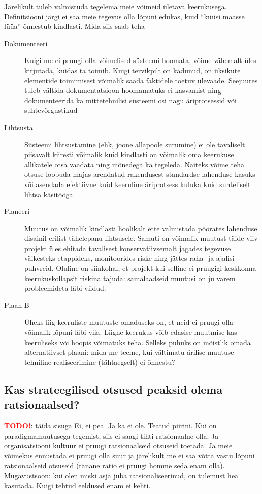\documentclass{tufte-book}
\newcommand{\TODO}{\textcolor{red}{\bf TODO!}\xspace}
\begin{document}
Järelikult tuleb valmistuda tegelema meie võimeid ületava keerukusega. Definitsiooni järgi ei saa meie tegevus olla lõpuni edukas, kuid \enquote{küüsi maasse lüüa} õnnestub kindlasti. Mida siis saab teha 
\begin{description}
	\item[Dokumenteeri] Kuigi me ei pruugi olla võimelised süsteemi hoomata, võime vähemalt üles kirjutada, kuidas ta toimib. Kuigi tervikpilt on kadunud, on üksikute elementide toimimisest võimalik saada faktidele toetuv ülevaade. Seejuures tuleb vältida dokumentatsioon hoomamatuks ei kasvamist ning dokumenteerida ka mittetehnilisi süsteemi osi nagu äriprotsessid või suhtevõrgustikud
	\item[Lihtsusta] Süsteemi lihtsustamine (ehk, joone allapoole surumine) ei ole tavaliselt piisavalt kiiresti võimalik kuid kindlasti on võimalik oma keerukuse allikatele otsa vaadata ning mõnedega ka tegeleda. Näiteks võime teha otsuse loobuda majas arendatud rakendusest standardse lahenduse kasuks või asendada efektiivne kuid keeruline äriprotsess kuluka kuid suhteliselt lihtsa käsitööga
	\item[Planeeri] Muutus on võimalik kindlasti hoolikalt ette valmistada pöörates lahenduse disainil erilist tähelepanu lihtsusele. Samuti on võimalik muutust täide viiv projekt üles ehitada tavalisest konservatiivsemalt jagades tegevuse väikesteks etappideks, monitoorides riske ning jättes raha- ja ajalisi puhvreid. Oluline on siinkohal, et projekt kui selline ei pruugigi keskkonna keerukuskollapsit riskina tajuda: samalaadseid muutusi on ju varem probleemideta läbi viidud. 
	\item[Plaan B] Üheks liig keeruliste muutuste omaduseks on, et neid ei pruugi olla võimalik lõpuni läbi viia. Liigne keerukus võib edasise muutmise kas keeruliseks või hoopis võimatuks teha. Selleks puhuks on mõistlik omada alternatiivset plaani: mida me teeme, kui vältimatu ärilise muutuse tehniline realiseerimine (tähtaegselt) ei õnnestu?
\end{description}

\subsection{Kas strateegilised otsused peaksid olema ratsionaalsed?}
\TODO: täida sisuga
Ei, ei pea. Ja ka ei ole. Teatud piirini. Kui on paradigmamuutusega tegemist, siis ei saagi tihti ratsionaalne olla. Ja organisatsiooni kultuur ei pruugi ratsionaalseid otsuseid toetada. Ja meie võimekus ennustada ei pruugi olla suur ja järelikult me ei saa võtta vastu lõpuni ratsionaalseid otsuseid (tänane ratio ei pruugi homme seda enam olla). Mugavustsoon: kui olen miski asja juba ratsionaliseerinud, on tulemust hea kasutada. Kuigi tehtud eeldused enam ei kehti.
\end{document}
